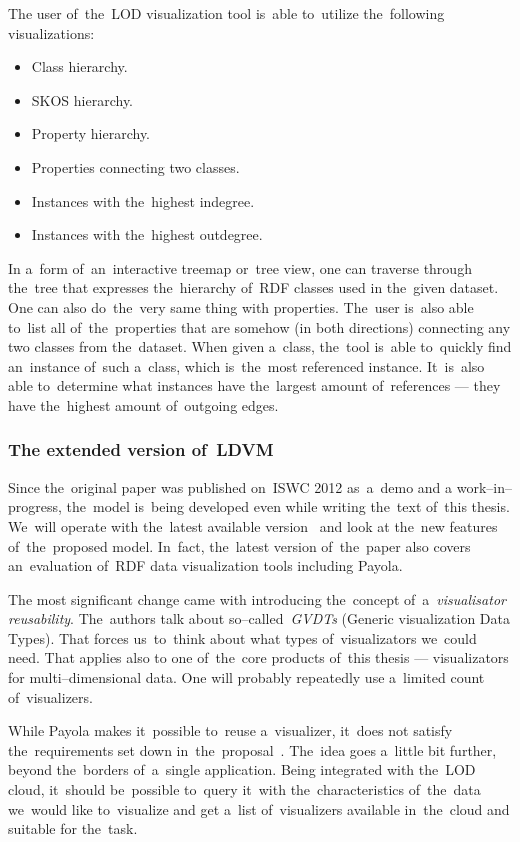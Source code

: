 The user of~the~LOD visualization tool is~able to~utilize the~following 
visualizations:

\begin{itemize}
\item Class hierarchy.
\item SKOS hierarchy.
\item Property hierarchy.
\item Properties connecting two classes.
\item Instances with the~highest indegree.
\item Instances with the~highest outdegree.
\end{itemize}

In a~form of~an~interactive treemap or~tree view, one 
can traverse through the~tree that expresses the~hierarchy of~RDF classes used 
in the~given dataset. One can also do~the~very same thing with properties. The~user is~also able to~list all of~the~properties that are somehow (in both directions)
connecting any two classes from the~dataset. When given a~class, the~tool is~able to~quickly find an~instance of~such a~class, which is~the~most referenced
instance. It~is~also able to~determine what instances have the~largest amount of~references
--- they have the~highest amount of~outgoing
edges.

\subsubsection{The extended version of~LDVM}
Since the~original paper was published on~ISWC 2012 as~a~demo and a
work--in--progress, the~model is~being developed even while writing the~text of~this thesis. We~will operate with the~latest available version~\cite{ldvm2} and look 
at the~new features of~the~proposed model. In~fact, the~latest version of~the~paper also covers an~evaluation of~RDF data visualization tools including 
Payola.

The most significant change came with introducing the~concept of~a~\emph{visualisator 
reusability}. The~authors talk about so--called~\emph{GVDTs} (Generic visualization Data Types).
That forces us~to~think about what types of~visualizators we~could need. That applies also to
one of~the~core products of~this thesis --- visualizators for multi--dimensional data.
One will probably repeatedly use a~limited count of~visualizers.

While Payola makes it~possible to~reuse a~visualizer, it~does not satisfy the~requirements set down in~the~proposal~\cite{ldvm2}. The~idea goes a~little bit 
further, beyond the~borders of~a~single application. Being integrated with the~LOD cloud, it~should be~possible to~query it~with the~characteristics of~the~data we~would like to~visualize and get a~list of~visualizers 
available in~the~cloud and suitable for the~task.

